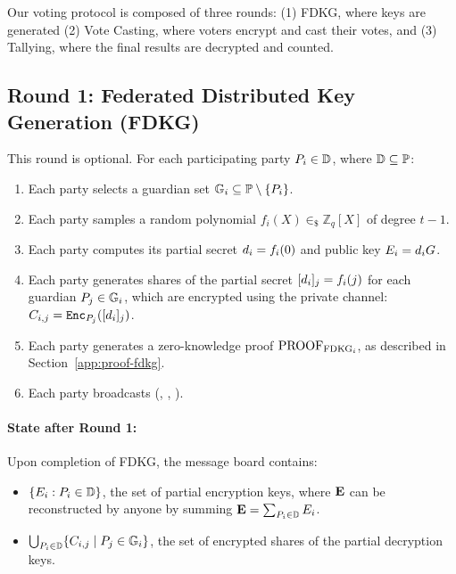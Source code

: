 \documentclass[lettersize,journal]{IEEEtran}
\theoremstyle{definition}
\begin{document}
Our voting protocol is composed of three rounds: (1) FDKG, where keys are generated (2) Vote Casting, where voters encrypt and cast their votes, and (3) Tallying, where the final results are decrypted and counted.

\subsection{Round 1: Federated Distributed Key Generation (FDKG)}

This round is optional. For each participating party $P_{i} \in \mathbb{D}$, where $\mathbb{D} \subseteq \mathbb{P}$:
\begin{enumerate}
    \item Each party selects a guardian set $\mathbb{G}_{i} \subseteq \mathbb{P} \setminus \{P_{i}\}$.

    \item Each party samples a random polynomial $f_{i}(X) \in_{\$} \mathbb{Z}_q[X]$ of degree $t-1$.
    
    \item  Each party computes its partial secret $d_{i}= f_i(0)$ and public key $E_{i} = d_{i} G$.
    
    \item  Each party generates shares of the partial secret $[d_{i}]_{j}=f_i(j)$ for each guardian $P_j \in \mathbb{G}_{i}$, which are encrypted using the private channel: $C_{i,j}=\texttt{Enc}_{P_{j}}([d_{i}]_{j})$.
    \item Each party generates a zero-knowledge proof $\textrm{PROOF}_{\textrm{FDKG}_{i}}$, as described in Section~\ref{app:proof-fdkg}.
    \item Each party broadcasts (, , ).
\end{enumerate}
\paragraph*{State after Round 1:}
Upon completion of FDKG, the message board contains:
\begin{itemize}
    \item $\{E_{i} : P_{i} \in \mathbb{D}\}$, the set of partial encryption keys, where $\textbf{E}$ can be reconstructed by anyone by summing $\textbf{E}=\sum_{P_{i} \in \mathbb{D}} E_{i}$.
    \item $\bigcup_{P_{i} \in \mathbb{D}} \{C_{i,j} \mid P_j \in \mathbb{G}_i\}$, the set of encrypted shares of the partial decryption keys.
\end{itemize}
\end{document}
